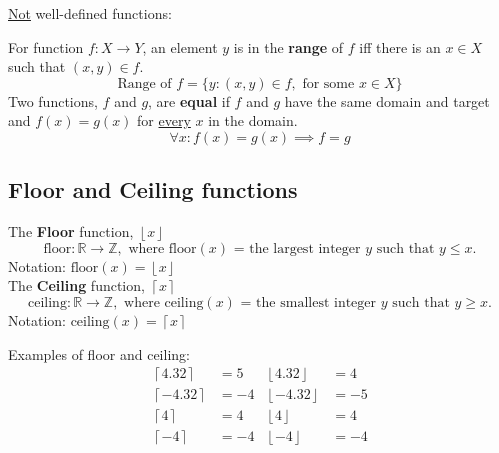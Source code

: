 \underline{Not} well-defined functions:
\begin{center}
  \qquad
\end{center}

For function $f: X \rightarrow Y$, an element $y$ is in the \textbf{range} of $f$
iff there is an $x \in X$ such that $(x, y) \in f$.
\[
  \text{Range of } f = \{y : (x, y) \in f, \text{ for some } x \in X\}
\]
Two functions, $f$ and $g$, are \textbf{equal} if $f$ and $g$ have the same domain and target and
$f(x) = g(x)$ for \underline{every} $x$ in the domain.
\[
  \forall x : f(x) = g(x) \implies f = g
\]

\subsection{Floor and Ceiling functions}

The \textbf{Floor} function, $\left\lfloor x\right\rfloor$
\[
  \text{floor}: \mathbb{R} \rightarrow \mathbb{Z}, \text{ where floor$(x)$ = the largest integer $y$ such that $y \leq x$.}
\]
Notation: $\text{floor}(x) = \left\lfloor x\right\rfloor$
\[\]
\noindent The \textbf{Ceiling} function, $\left\lceil x\right\rceil$
\[
  \text{ceiling}: \mathbb{R} \rightarrow \mathbb{Z}, \text{ where ceiling$(x)$ = the smallest integer $y$ such that $y \geq x$.}
\]
Notation: $\text{ceiling}(x) = \left\lceil x\right\rceil$

\noindent Examples of floor and ceiling:
\begin{align*}
  \left\lceil 4.32\right\rceil  & = 5  & \left\lfloor 4.32\right\rfloor  & = 4  \\
  \left\lceil -4.32\right\rceil & = -4 & \left\lfloor -4.32\right\rfloor & = -5 \\
  \left\lceil 4\right\rceil     & = 4  & \left\lfloor 4\right\rfloor     & = 4  \\
  \left\lceil -4\right\rceil    & = -4 & \left\lfloor -4\right\rfloor    & = -4 \\
\end{align*}

